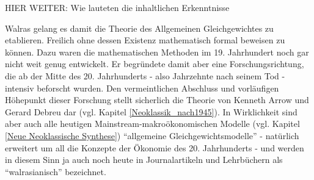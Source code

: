 HIER WEITER:
Wie lauteten die inhaltlichen Erkenntnisse


Walras gelang es damit die Theorie des Allgemeinen Gleichgewichtes zu etablieren. Freilich ohne dessen Existenz mathematisch formal beweisen zu können. Dazu waren die mathematischen Methoden im 19. Jahrhundert noch gar nicht weit genug entwickelt. Er begründete damit aber eine Forschungsrichtung, die ab der Mitte des 20. Jahrhunderts - also Jahrzehnte nach seinem Tod - intensiv beforscht wurden. Den vermeintlichen Abschluss und vorläufigen Höhepunkt dieser Forschung stellt sicherlich die Theorie von Kenneth Arrow und Gerard Debreu dar (vgl. Kapitel \ref{Neoklassik_nach1945}). In Wirklichkeit sind aber auch alle heutigen Mainstream-makroökonomischen Modelle (vgl. Kapitel \ref{Neue Neoklassische Synthese}) "`allgemeine Gleichgewichtsmodelle"' - natürlich erweitert um all die Konzepte der Ökonomie des 20. Jahrhunderts - und werden in diesem Sinn ja auch noch heute in Journalartikeln und Lehrbüchern als "`walrasianisch"' bezeichnet.

